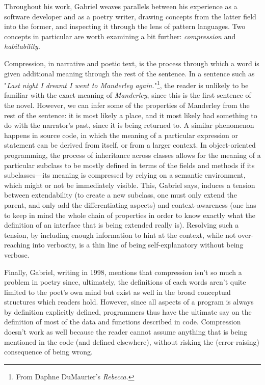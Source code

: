 Throughout his work, Gabriel weaves parallels between his experience as a software developer and as a poetry writer, drawing concepts from the latter field into the former, and inspecting it through the lens of pattern languages. Two concepts in particular are worth examining a bit further: \emph{compression} and \emph{habitability}.

Compression, in narrative and poetic text, is the process through which a word is given additional meaning through the rest of the sentence. In a sentence such as "\emph{Last night I dreamt I went to Manderley again.}"\footnote{From Daphne DuMaurier's \emph{Rebecca}.}, the reader is unlikely to be familiar with the exact meaning of \emph{Manderley}, since this is the first sentence of the novel. However, we can infer some of the properties of Manderley from the rest of the sentence: it is most likely a place, and it most likely had something to do with the narrator's past, since it is being returned to. A similar phenomenon happens in source code, in which the meaning of a particular expression or statement can be derived from itself, or from a larger context. In object-oriented programming, the process of inheritance across classes allows for the meaning of a particular subclass to be mostly defined in terms of the fields and methods if its subclasses—its meaning is compressed by relying on a semantic environment, which might or not be immediately visible. This, Gabriel says, induces a tension between extendability (to create a new subclass, one must only extend the parent, and only add the differentiating aspects) and context-awareness (one has to keep in mind the whole chain of properties in order to know exactly what the definition of an interface that is being extended really is). Resolving such a tension, by including enough information to hint at the context, while not over-reaching into verbosity, is a thin line of being self-explanatory without being verbose.

Finally, Gabriel, writing in 1998, mentions that compression isn't so much a problem in poetry since, ultimately, the definitions of each words aren't quite limited to the poet's own mind but exist as well in the broad conceptual structures which readers hold. However, since all aspects of a program is always by definition explicitly defined, programmers thus have the ultimate say on the definition of most of the data and functions described in code. Compression doesn't work as well because the reader cannot assume anything that is being mentioned in the code (and defined elsewhere), without risking the (error-raising) consequence of being wrong.

